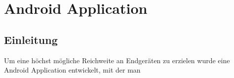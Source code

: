 \chapter{Android Application}
\section{Einleitung}
Um eine höchst mögliche Reichweite an Endgeräten zu erzielen wurde eine Android Application entwickelt, mit der man 